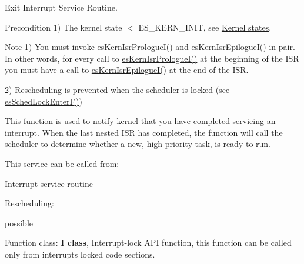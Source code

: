 Exit Interrupt Service Routine. 

\begin{DoxyPrecond}{Precondition}
1) {\ttfamily The kernel state $<$ E\-S\-\_\-\-K\-E\-R\-N\-\_\-\-I\-N\-I\-T}, see \hyperlink{states}{Kernel states}. 
\end{DoxyPrecond}
\begin{DoxyNote}{Note}
1) You must invoke \hyperlink{group__kern__intf_ga194f9cbc5398fe0938504a378fcff810}{es\-Kern\-Isr\-Prologue\-I()} and \hyperlink{group__kern__intf_ga62d9b43eb8faf6c5df37e7b89811ac8d}{es\-Kern\-Isr\-Epilogue\-I()} in pair. In other words, for every call to \hyperlink{group__kern__intf_ga194f9cbc5398fe0938504a378fcff810}{es\-Kern\-Isr\-Prologue\-I()} at the beginning of the I\-S\-R you must have a call to \hyperlink{group__kern__intf_ga62d9b43eb8faf6c5df37e7b89811ac8d}{es\-Kern\-Isr\-Epilogue\-I()} at the end of the I\-S\-R. 

2) Rescheduling is prevented when the scheduler is locked (see \hyperlink{group__kern__intf_ga1e60d9df6ad1712ed57cd4ca038fcad2}{es\-Sched\-Lock\-Enter\-I()})
\end{DoxyNote}
This function is used to notify kernel that you have completed servicing an interrupt. When the last nested I\-S\-R has completed, the function will call the scheduler to determine whether a new, high-\/priority task, is ready to run. \begin{DoxyParagraph}{This service can be called from\-:}

\begin{DoxyItemize}
\item Interrupt service routine 
\end{DoxyItemize}
\end{DoxyParagraph}
\begin{DoxyParagraph}{Rescheduling\-:}

\begin{DoxyItemize}
\item possible 
\end{DoxyItemize}
\end{DoxyParagraph}
\begin{DoxyParagraph}{Function class\-:}
{\bfseries I class}, Interrupt-\/lock A\-P\-I function, this function can be called only from interrupts locked code sections. 
\end{DoxyParagraph}

